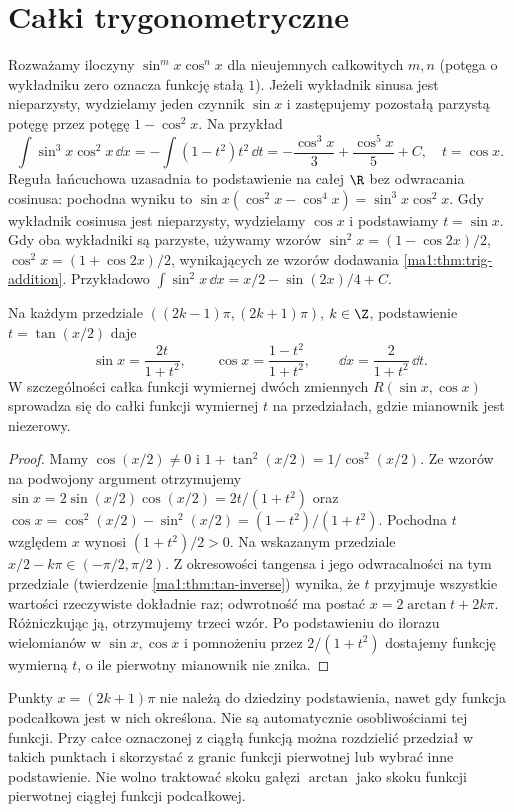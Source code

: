 \section{Całki trygonometryczne}
\begin{przyklad}
\label{ma1:ex:trigonometric-powers}
Rozważamy iloczyny $\sin^m x\cos^n x$ dla nieujemnych całkowitych $m,n$ (potęga o wykładniku zero oznacza funkcję stałą $1$). Jeżeli wykładnik sinusa jest nieparzysty, wydzielamy jeden czynnik $\sin x$ i zastępujemy pozostałą parzystą potęgę przez potęgę $1-\cos^2x$. Na przykład
\[
 \int\sin^3x\cos^2x\,\dd x
 =-\int(1-t^2)t^2\,\dd t
 =-\frac{\cos^3x}{3}+\frac{\cos^5x}{5}+C,
 \quad t=\cos x.
\]
Reguła łańcuchowa uzasadnia to podstawienie na całej $\R$ bez odwracania cosinusa: pochodna wyniku to $\sin x(\cos^2x-\cos^4x)=\sin^3x\cos^2x$. Gdy wykładnik cosinusa jest nieparzysty, wydzielamy $\cos x$ i podstawiamy $t=\sin x$. Gdy oba wykładniki są parzyste, używamy wzorów $\sin^2x=(1-\cos2x)/2$, $\cos^2x=(1+\cos2x)/2$, wynikających ze wzorów dodawania \ref{ma1:thm:trig-addition}. Przykładowo
$\int\sin^2x\,\dd x=x/2-\sin(2x)/4+C$.
\end{przyklad}

\begin{twierdzenie}
\label{ma1:thm:weierstrass-substitution}
Na każdym przedziale $((2k-1)\pi,(2k+1)\pi)$, $k\in\Z$, podstawienie $t=\tan(x/2)$ daje
\[
 \sin x=\frac{2t}{1+t^2},\qquad
 \cos x=\frac{1-t^2}{1+t^2},\qquad
 \dd x=\frac{2}{1+t^2}\,\dd t.
\]
W szczególności całka funkcji wymiernej dwóch zmiennych $R(\sin x,\cos x)$ sprowadza się do całki funkcji wymiernej $t$ na przedziałach, gdzie mianownik jest niezerowy.
\end{twierdzenie}
\begin{proof}
Mamy $\cos(x/2)\ne0$ i $1+\tan^2(x/2)=1/\cos^2(x/2)$. Ze wzorów na podwojony argument otrzymujemy $\sin x=2\sin(x/2)\cos(x/2)=2t/(1+t^2)$ oraz $\cos x=\cos^2(x/2)-\sin^2(x/2)=(1-t^2)/(1+t^2)$. Pochodna $t$ względem $x$ wynosi $(1+t^2)/2>0$. Na wskazanym przedziale $x/2-k\pi\in(-\pi/2,\pi/2)$. Z okresowości tangensa i jego odwracalności na tym przedziale (twierdzenie \ref{ma1:thm:tan-inverse}) wynika, że $t$ przyjmuje wszystkie wartości rzeczywiste dokładnie raz; odwrotność ma postać $x=2\arctan t+2k\pi$. Różniczkując ją, otrzymujemy trzeci wzór. Po podstawieniu do ilorazu wielomianów w $\sin x,\cos x$ i pomnożeniu przez $2/(1+t^2)$ dostajemy funkcję wymierną $t$, o ile pierwotny mianownik nie znika.
\end{proof}
Punkty $x=(2k+1)\pi$ nie należą do dziedziny podstawienia, nawet gdy funkcja podcałkowa jest w nich określona. Nie są automatycznie osobliwościami tej funkcji. Przy całce oznaczonej z ciągłą funkcją można rozdzielić przedział w takich punktach i skorzystać z granic funkcji pierwotnej lub wybrać inne podstawienie. Nie wolno traktować skoku gałęzi $\arctan$ jako skoku funkcji pierwotnej ciągłej funkcji podcałkowej.


